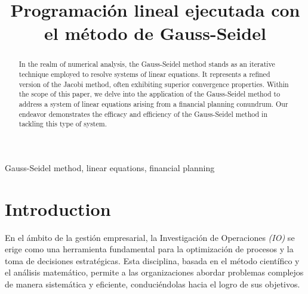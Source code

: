 \documentclass[conference]{IEEEtran}
\begin{document}
\title{Programación lineal ejecutada con el método de Gauss-Seidel\\}

\author{
    \and
    \and
}

\maketitle



\begin{abstract}
    In the realm of numerical analysis, the Gauss-Seidel method stands as an
    iterative technique employed to resolve systems of linear equations. It
    represents a refined version of the Jacobi method, often exhibiting
    superior convergence properties. Within the scope of this paper, we delve
    into the application of the Gauss-Seidel method to address a system of
    linear equations arising from a financial planning conundrum. Our
    endeavor demonstrates the efficacy and efficiency of the Gauss-Seidel
    method in tackling this type of system.
\end{abstract}

\begin{IEEEkeywords}
    Gauss-Seidel method, linear equations, financial planning
\end{IEEEkeywords}

\nocite{*}

\section{Introduction}
En el ámbito de la gestión empresarial, la Investigación de Operaciones
\textit{(IO)} se erige como una herramienta fundamental para la optimización de
procesos y la toma de decisiones estratégicas. Esta disciplina, basada
en el método científico y el análisis matemático, permite a las
organizaciones abordar problemas complejos de manera sistemática y
eficiente, conduciéndolas hacia el logro de sus objetivos.
\end{document}
